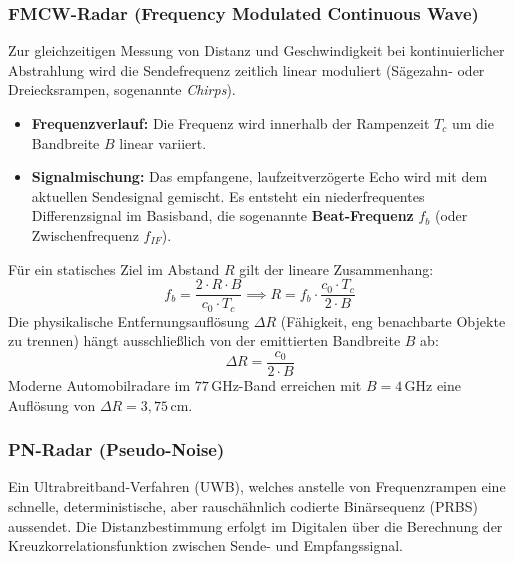 \documentclass[8pt,a4paper]{article}
\begin{document}
\subsubsection{FMCW-Radar (Frequency Modulated Continuous Wave)}
Zur gleichzeitigen Messung von Distanz und Geschwindigkeit bei kontinuierlicher Abstrahlung wird die Sendefrequenz zeitlich linear moduliert (Sägezahn- oder Dreiecksrampen, sogenannte \textit{Chirps}). 

\begin{itemize}
    \item \textbf{Frequenzverlauf:} Die Frequenz wird innerhalb der Rampenzeit $T_c$ um die Bandbreite $B$ linear variiert.
    \item \textbf{Signalmischung:} Das empfangene, laufzeitverzögerte Echo wird mit dem aktuellen Sendesignal gemischt. Es entsteht ein niederfrequentes Differenzsignal im Basisband, die sogenannte \textbf{Beat-Frequenz} $f_b$ (oder Zwischenfrequenz $f_{IF}$).
\end{itemize}
Für ein statisches Ziel im Abstand $R$ gilt der lineare Zusammenhang:
\begin{equation}
    f_b = \frac{2 \cdot R \cdot B}{c_0 \cdot T_c} \implies R = f_b \cdot \frac{c_0 \cdot T_c}{2 \cdot B}
\end{equation}
Die physikalische Entfernungsauflösung $\Delta R$ (Fähigkeit, eng benachbarte Objekte zu trennen) hängt ausschließlich von der emittierten Bandbreite $B$ ab:
\begin{equation}
    \Delta R = \frac{c_0}{2 \cdot B}
\end{equation}
Moderne Automobilradare im $77$\,GHz-Band erreichen mit $B = 4$\,GHz eine Auflösung von $\Delta R = 3{,}75$\,cm.

\subsubsection{PN-Radar (Pseudo-Noise)}
Ein Ultrabreitband-Verfahren (UWB), welches anstelle von Frequenzrampen eine schnelle, deterministische, aber rauschähnlich codierte Binärsequenz (PRBS) aussendet. Die Distanzbestimmung erfolgt im Digitalen über die Berechnung der Kreuzkorrelationsfunktion zwischen Sende- und Empfangssignal.
\end{document}
